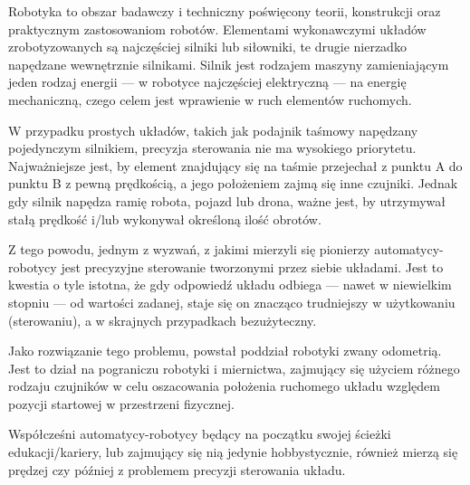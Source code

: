 \label{ch:wstep}

Robotyka to obszar badawczy i techniczny poświęcony teorii, konstrukcji oraz praktycznym zastosowaniom robotów. Elementami wykonawczymi układów zrobotyzowanych są najczęściej silniki lub siłowniki, te drugie nierzadko napędzane wewnętrznie silnikami. Silnik jest rodzajem maszyny zamieniającym jeden rodzaj energii --- w robotyce najczęściej elektryczną --- na energię mechaniczną, czego celem jest wprawienie w ruch elementów ruchomych.

W przypadku prostych układów, takich jak podajnik taśmowy napędzany pojedynczym silnikiem, precyzja sterowania nie ma wysokiego priorytetu. Najważniejsze jest, by element znajdujący się na taśmie przejechał z punktu A do punktu B z pewną prędkością, a jego położeniem zajmą się inne czujniki. Jednak gdy silnik napędza ramię robota, pojazd lub drona, ważne jest, by utrzymywał stałą prędkość i/lub wykonywał określoną ilość obrotów.

Z tego powodu, jednym z wyzwań, z jakimi mierzyli się pionierzy automatycy-robotycy jest precyzyjne sterowanie tworzonymi przez siebie układami. Jest to kwestia o tyle istotna, że gdy odpowiedź układu odbiega --- nawet w niewielkim stopniu --- od wartości zadanej, staje się on znacząco trudniejszy w użytkowaniu (sterowaniu), a w skrajnych przypadkach bezużyteczny.

Jako rozwiązanie tego problemu, powstał poddział robotyki zwany odometrią. Jest to dział na pograniczu robotyki i miernictwa, zajmujący się użyciem różnego rodzaju czujników w celu oszacowania położenia ruchomego układu względem pozycji startowej w przestrzeni fizycznej.

Współcześni automatycy-robotycy będący na początku swojej ścieżki edukacji/kariery, lub zajmujący się nią jedynie hobbystycznie, również mierzą się prędzej czy później z problemem precyzji sterowania układu.